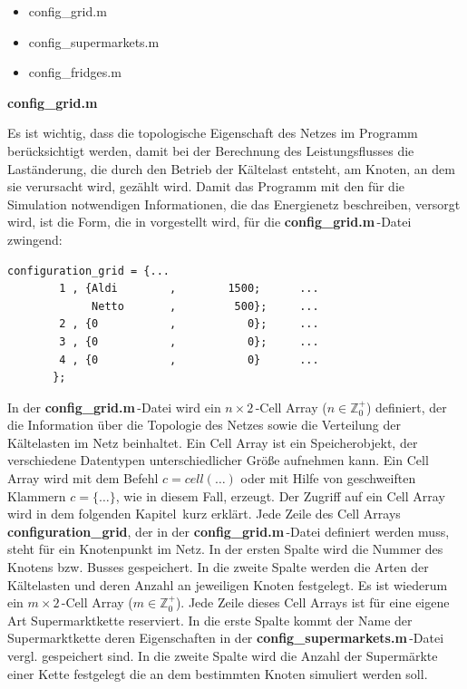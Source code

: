 \begin{itemize}
	\item config\_grid.m
	\item config\_supermarkets.m
	\item config\_fridges.m
\end{itemize}
\vspace{3mm}
\noindent\textbf{config\_grid.m}
\vspace{3mm}

Es ist wichtig, dass die topologische Eigenschaft des Netzes im Programm
berücksichtigt werden, damit bei der Berechnung des Leistungsflusses die
Laständerung, die durch den Betrieb der Kältelast entsteht, am Knoten, an dem
sie verursacht wird, gezählt wird. Damit das Programm mit
den für die Simulation notwendigen Informationen, die das Energienetz
beschreiben, versorgt wird, ist die Form, die in  vorgestellt
wird, für die \textbf{config\_grid.m$\,$}-Datei zwingend:

\begin{lstlisting}[float=h,caption={config\_grid.m},label={cgrid}]
%%	Bus,  Supermarkets,	  Number of Supermarkets
configuration_grid = {...
        1 , {Aldi	     ,	      1500;	     ...
             Netto	     ,	       500};	 ...
        2 , {0	         ,           0};	 ...
        3 , {0	         ,           0};	 ...
        4 , {0	         ,           0}	     ...
       };
\end{lstlisting}

In der \textbf{config\_grid.m}$\,$-Datei wird  ein $n\times2\,$-Cell Array
($n\in \mathbb{Z}^+_0$) definiert, der die Information über die Topologie des
Netzes sowie die Verteilung der Kältelasten im Netz beinhaltet. Ein Cell Array
ist ein Speicherobjekt, der verschiedene Datentypen unterschiedlicher Größe
aufnehmen kann\cite[Teil 2, Seite 15]{MATLAB-Buch}.  Ein Cell Array wird mit dem
Befehl $c=cell(\ldots)$ oder mit Hilfe von geschweiften Klammern $c=\{\ldots\}$,
wie in diesem Fall, erzeugt. Der Zugriff auf ein Cell Array wird in dem
folgenden Kapitel$\,$ kurz
erklärt. Jede Zeile des Cell Arrays
\textbf{configuration\_grid}, der in der \textbf{config\_grid.m}$\,$-Datei
definiert werden muss, steht für ein Knotenpunkt im Netz. In der ersten Spalte
wird die Nummer des Knotens bzw. Busses gespeichert. In die zweite Spalte werden
die Arten der Kältelasten und deren Anzahl an jeweiligen Knoten festgelegt. Es
ist wiederum ein $m\times2\,$-Cell Array ($m\in \mathbb{Z}^+_0$). Jede Zeile
dieses Cell Arrays ist für eine eigene Art Supermarktkette reserviert. In die
erste Spalte kommt der Name der Supermarktkette deren Eigenschaften in der
\textbf{config\_supermarkets.m$\,$}-Datei vergl.   gespeichert
sind. In die zweite Spalte wird die Anzahl der Supermärkte einer Kette
festgelegt die an dem bestimmten Knoten simuliert werden soll.

